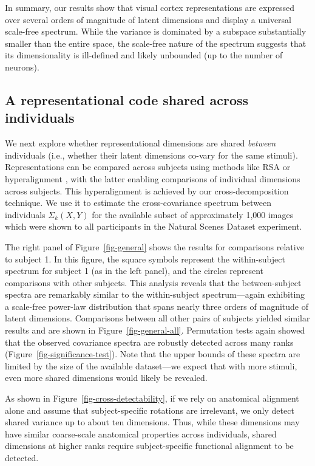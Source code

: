 \documentclass[10pt]{article}
\begin{document}
In summary, our results show that visual cortex representations are
expressed over several orders of magnitude of latent dimensions and
display a universal scale-free spectrum. While the variance is dominated
by a subspace substantially smaller than the entire space, the
scale-free nature of the spectrum suggests that its dimensionality is
ill-defined and likely unbounded (up to the number of neurons).

\subsection{A representational code shared across
individuals}\label{a-representational-code-shared-across-individuals}

We next explore whether representational dimensions are shared
\emph{between} individuals (i.e., whether their latent dimensions
co-vary for the same stimuli). Representations can be compared across
subjects using methods like RSA \autocite{Kriegeskorte2008} or
hyperalignment \autocite{Haxby2011}, with the latter enabling
comparisons of individual dimensions across subjects. This
hyperalignment is achieved by our cross-decomposition technique. We use
it to estimate the cross-covariance spectrum between individuals
\(\Sigma_k(X,Y)\) for the available subset of approximately 1,000 images
which were shown to all participants in the Natural Scenes Dataset
experiment.

The right panel of Figure~\ref{fig-general} shows the results for
comparisons relative to subject 1. In this figure, the square symbols
represent the within-subject spectrum for subject 1 (as in the left
panel), and the circles represent comparisons with other subjects. This
analysis reveals that the between-subject spectra are remarkably similar
to the within-subject spectrum---again exhibiting a scale-free power-law
distribution that spans nearly three orders of magnitude of latent
dimensions. Comparisons between all other pairs of subjects yielded
similar results and are shown in Figure~\ref{fig-general-all}.
Permutation tests again showed that the observed covariance spectra are
robustly detected across many ranks
(Figure~\ref{fig-significance-test}). Note that the upper bounds of
these spectra are limited by the size of the available dataset---we
expect that with more stimuli, even more shared dimensions would likely
be revealed.

As shown in Figure~\ref{fig-cross-detectability}, if we rely on
anatomical alignment alone and assume that subject-specific rotations
are irrelevant, we only detect shared variance up to about ten
dimensions. Thus, while these dimensions may have similar coarse-scale
anatomical properties across individuals, shared dimensions at higher
ranks require subject-specific functional alignment to be detected.
\end{document}
